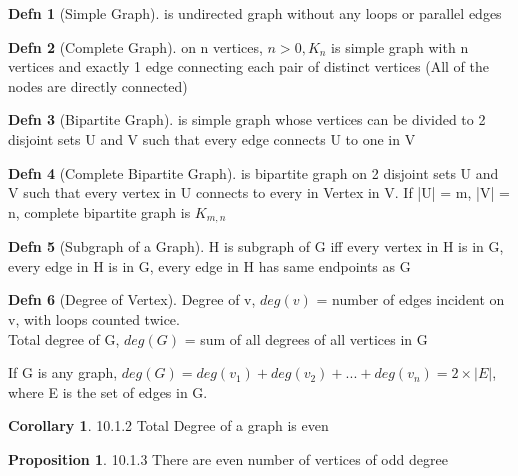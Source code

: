 \documentclass[a4paper]{article}
\theoremstyle{definition}
\newtheorem*{defn}{Defn}
\newtheorem*{propos}{Proposition}
\newtheorem*{corollary}{Corollary}
\newenvironment{theorem}[1]
  {\renewcommand\theinnertheorem{#1}\innertheorem}
  {\endinnertheorem}
\begin{document}
\begin{defn}[Simple Graph] is undirected graph without any loops or parallel edges \end{defn}
\begin{defn}[Complete Graph] on n vertices, $n > 0, K_n$ is simple graph with n vertices and exactly 1 edge connecting each pair of distinct vertices (All of the nodes are directly connected) \end{defn}
\begin{defn}[Bipartite Graph] is simple graph whose vertices can be divided to 2 disjoint sets U and V such that every edge connects U to one in V \end{defn}

\begin{defn}[Complete Bipartite Graph] is bipartite graph on 2 disjoint sets U and V such that every vertex in U connects to every in Vertex in V. If |U| = m, |V| = n, complete bipartite graph is $K_{m,n}$ \end{defn}

\begin{defn}[Subgraph of a Graph] H is subgraph of G iff every vertex in H is in G, every edge in H is in G, every edge in H has same endpoints as G \end{defn}

\begin{defn}[Degree of Vertex] Degree of v, $deg(v)$ = number of edges incident on v, with loops counted twice.\\ 
  Total degree of G, $deg(G)$ = sum of all degrees of all vertices in G
\end{defn}

\begin{theorem}{10.1.1}[Handshake Theorem] If G is any graph, $deg(G) = deg(v_1) + deg(v_2) + ... + deg(v_n) = 2 \times |E|$, where E is the set of edges in G. \end{theorem}
\begin{corollary}{10.1.2} Total Degree of a graph is even \end{corollary}
\begin{propos}{10.1.3} There are even number of vertices of odd degree \end{propos}
\end{document}
